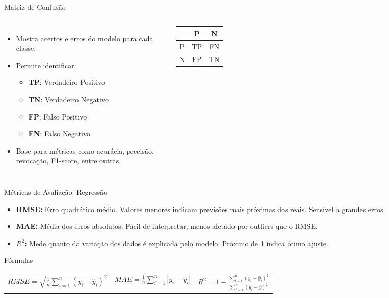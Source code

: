 \documentclass[aspectratio=169]{beamer}
\begin{document}
\begin{frame}{Matriz de Confusão}
  \begin{columns}
      \begin{itemize}
        \item Mostra acertos e erros do modelo para cada classe.
        \item Permite identificar:
          \begin{itemize}
            \item \textbf{TP}: Verdadeiro Positivo
            \item \textbf{TN}: Verdadeiro Negativo
            \item \textbf{FP}: Falso Positivo
            \item \textbf{FN}: Falso Negativo
          \end{itemize}
        \item Base para métricas como acurácia, precisão, revocação, F1-score, entre outras.
      \end{itemize}
      \centering
      \begin{tabular}{c|cc}
        & P & N \\
        \hline
        P & TP & FN \\
        N & FP & TN \\
      \end{tabular}
  \end{columns}
\end{frame}

\begin{frame}{Métricas de Avaliação: Regressão}
  \begin{itemize}
    \item \textbf{RMSE:} Erro quadrático médio. Valores menores indicam previsões mais próximas dos reais. Sensível a grandes erros.
    \item \textbf{MAE:} Média dos erros absolutos. Fácil de interpretar, menos afetado por outliers que o RMSE.
    \item \textbf{$R^2$:} Mede quanto da variação dos dados é explicada pelo modelo. Próximo de 1 indica ótimo ajuste.
  \end{itemize}
  \vspace{0.5em}
  \begin{block}{Fórmulas}
    \begin{center}
      \large
      \begin{tabular}{ccc}
        $RMSE = \sqrt{\frac{1}{n} \sum_{i=1}^n (y_i - \hat{y}_i)^2}$ &
        $MAE = \frac{1}{n} \sum_{i=1}^n |y_i - \hat{y}_i|$ &
        $R^2 = 1 - \frac{\sum_{i=1}^n (y_i - \hat{y}_i)^2}{\sum_{i=1}^n (y_i - \bar{y})^2}$
      \end{tabular}
    \end{center}
  \end{block}
\end{frame}
\end{document}
